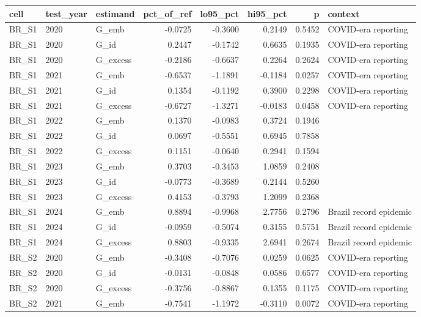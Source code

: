 \begin{tabular}{lllrrrrl}
\toprule
cell & test\_year & estimand & pct\_of\_ref & lo95\_pct & hi95\_pct & p & context \\
\midrule
BR\_S1 & 2020 & G\_emb & -0.0725 & -0.3600 & 0.2149 & 0.5452 & COVID-era reporting \\
BR\_S1 & 2020 & G\_id & 0.2447 & -0.1742 & 0.6635 & 0.1935 & COVID-era reporting \\
BR\_S1 & 2020 & G\_excess & -0.2186 & -0.6637 & 0.2264 & 0.2624 & COVID-era reporting \\
BR\_S1 & 2021 & G\_emb & -0.6537 & -1.1891 & -0.1184 & 0.0257 & COVID-era reporting \\
BR\_S1 & 2021 & G\_id & 0.1354 & -0.1192 & 0.3900 & 0.2298 & COVID-era reporting \\
BR\_S1 & 2021 & G\_excess & -0.6727 & -1.3271 & -0.0183 & 0.0458 & COVID-era reporting \\
BR\_S1 & 2022 & G\_emb & 0.1370 & -0.0983 & 0.3724 & 0.1946 &  \\
BR\_S1 & 2022 & G\_id & 0.0697 & -0.5551 & 0.6945 & 0.7858 &  \\
BR\_S1 & 2022 & G\_excess & 0.1151 & -0.0640 & 0.2941 & 0.1594 &  \\
BR\_S1 & 2023 & G\_emb & 0.3703 & -0.3453 & 1.0859 & 0.2408 &  \\
BR\_S1 & 2023 & G\_id & -0.0773 & -0.3689 & 0.2144 & 0.5260 &  \\
BR\_S1 & 2023 & G\_excess & 0.4153 & -0.3793 & 1.2099 & 0.2368 &  \\
BR\_S1 & 2024 & G\_emb & 0.8894 & -0.9968 & 2.7756 & 0.2796 & Brazil record epidemic \\
BR\_S1 & 2024 & G\_id & -0.0959 & -0.5074 & 0.3155 & 0.5751 & Brazil record epidemic \\
BR\_S1 & 2024 & G\_excess & 0.8803 & -0.9335 & 2.6941 & 0.2674 & Brazil record epidemic \\
BR\_S2 & 2020 & G\_emb & -0.3408 & -0.7076 & 0.0259 & 0.0625 & COVID-era reporting \\
BR\_S2 & 2020 & G\_id & -0.0131 & -0.0848 & 0.0586 & 0.6577 & COVID-era reporting \\
BR\_S2 & 2020 & G\_excess & -0.3756 & -0.8867 & 0.1355 & 0.1175 & COVID-era reporting \\
BR\_S2 & 2021 & G\_emb & -0.7541 & -1.1972 & -0.3110 & 0.0072 & COVID-era reporting \\

\end{tabular}
